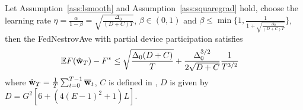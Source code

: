 

\begin{theorem}
	Let Assumption~\ref{ass:lsmooth} and Assumption~\ref{ass:squaregrad} hold,  choose the learning rate $\eta = \frac{\alpha}{1 - \beta} = \sqrt{\frac{\Delta_0}{(D+C)T}}$, $\beta \in (0, 1)$ and $\beta \leq \min\{1, \frac{1}{1 + \sqrt{\frac{\Delta_0}{(D+C)T}}}\}$, then the FedNestrovAve with partial device participation satisfies
	\begin{align}
		 \mathbb{E} F(\hat{{\mathbf{w}}}_T) - F^* &\leq \sqrt{\frac{\Delta_0(D + C)}{T}} + \frac{\Delta_0^{3/2}}{2\sqrt{D+C}}\frac{1}{T^{3/2}} 
	\end{align}
	where $\hat{{\mathbf{w}}}_T = \frac{1}{T}\sum_{t=0}^{T-1} {\overline{\mathbf{w}}}_t$, $C$ is defined in \eq{\ref{eq:partialsample}},
$D$ is given by $D =  G^2[6 + (4(E-1)^2+1)L]$.
\end{theorem}

